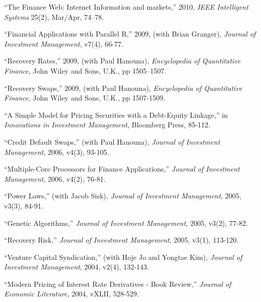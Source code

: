 \documentclass{article}
\begin{document}
\begin{etaremune}
\item ``The Finance Web: Internet Information and markets,'' 2010, {\it IEEE Intelligent Systems} 25(2), Mar/Apr, 74--78. 

\item ``Financial Applications with Parallel R,'' 2009, (with Brian Granger), {\it Journal of Investment Management}, v7(4), 66-77. 	

\item ``Recovery Rates,'' 2009, (with Paul Hanouna),
{\it Encyclopedia of Quantitative Finance}, John Wiley and Sons, U.K., pp 1505--1507.  

\item ``Recovery Swaps,'' 2009, (with Paul Hanouna), 
{\it Encyclopedia of Quantitative Finance}, John Wiley and Sons, U.K., pp 1507-1509.  

\item ``A Simple Model for Pricing Securities with a Debt-Equity Linkage,'' in 
{\it Innovations in Investment Management}, Bloomberg Press, 85-112.


\item ``Credit Default Swaps,'' (with Paul Hanouna),  
{\it Journal of Investment Management}, 2006, v4(3), 93-105. 

\item ``Multiple-Core Processors for Finance Applications,'' 
{\it Journal of Investment Management}, 2006, v4(2), 76-81.

\item ``Power Laws,'' (with Jacob Sisk), 
{\it Journal of Investment Management}, 2005, v3(3), 84-91. 

\item ``Genetic Algorithms,'' 
{\it Journal of Investment Management}, 2005, v3(2), 77-82.

\item ``Recovery Risk,''
{\it Journal of Investment Management}, 2005, v3(1), 113-120. 

\item ``Venture Capital Syndication,'' (with Hoje Jo and Yongtae Kim), 
{\it Journal of Investment Management}, 2004, v2(4), 132-143. 

\item ``Modern Pricing of Interest Rate Derivatives - Book Review,''
{\it Journal of Economic Literature}, 2004, vXLII, 528-529.


\end{etaremune}
\end{document}
